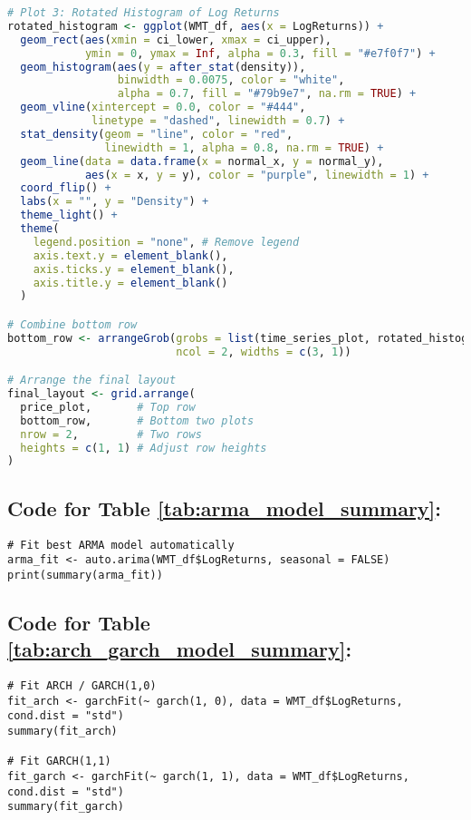\documentclass{article}
\newcommand{\1}{\mathbbm{1}}
\theoremstyle{definition}
\begin{document}
\begin{lstlisting}[language=R]
# Plot 3: Rotated Histogram of Log Returns
rotated_histogram <- ggplot(WMT_df, aes(x = LogReturns)) +
  geom_rect(aes(xmin = ci_lower, xmax = ci_upper), 
            ymin = 0, ymax = Inf, alpha = 0.3, fill = "#e7f0f7") +
  geom_histogram(aes(y = after_stat(density)), 
                 binwidth = 0.0075, color = "white", 
                 alpha = 0.7, fill = "#79b9e7", na.rm = TRUE) +
  geom_vline(xintercept = 0.0, color = "#444", 
             linetype = "dashed", linewidth = 0.7) +
  stat_density(geom = "line", color = "red", 
               linewidth = 1, alpha = 0.8, na.rm = TRUE) +
  geom_line(data = data.frame(x = normal_x, y = normal_y), 
            aes(x = x, y = y), color = "purple", linewidth = 1) +
  coord_flip() +
  labs(x = "", y = "Density") +
  theme_light() +
  theme(
    legend.position = "none", # Remove legend
    axis.text.y = element_blank(),
    axis.ticks.y = element_blank(),
    axis.title.y = element_blank()
  )

# Combine bottom row
bottom_row <- arrangeGrob(grobs = list(time_series_plot, rotated_histogram),
                          ncol = 2, widths = c(3, 1))

# Arrange the final layout
final_layout <- grid.arrange(
  price_plot,       # Top row
  bottom_row,       # Bottom two plots
  nrow = 2,         # Two rows
  heights = c(1, 1) # Adjust row heights
)
\end{lstlisting}

\subsection{Code for Table \ref{tab:arma_model_summary}:}
\label{subsec:arma_model_summary}

\begin{lstlisting}
# Fit best ARMA model automatically
arma_fit <- auto.arima(WMT_df$LogReturns, seasonal = FALSE)
print(summary(arma_fit))
\end{lstlisting}

\subsection{Code for Table \ref{tab:arch_garch_model_summary}:}
\label{subsec:arch_garch_model_summary}

\begin{lstlisting}
# Fit ARCH / GARCH(1,0)
fit_arch <- garchFit(~ garch(1, 0), data = WMT_df$LogReturns, cond.dist = "std")
summary(fit_arch)

# Fit GARCH(1,1)
fit_garch <- garchFit(~ garch(1, 1), data = WMT_df$LogReturns, cond.dist = "std")
summary(fit_garch)
\end{lstlisting}
\end{document}
